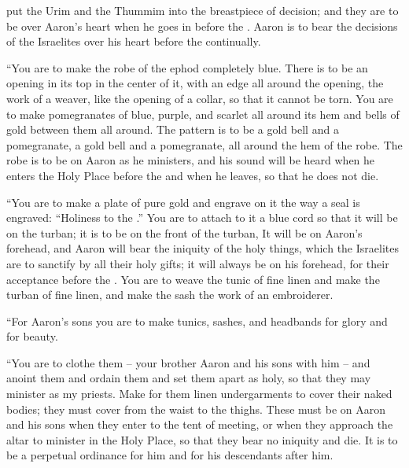 {put
the Urim
and the Thummim
into the breastpiece
of decision;
and they are to be
over
Aaron’s
heart
when he goes
in before
the {}. Aaron
is to bear
the
decisions
of the Israelites
over
his heart
before
the {}
continually.
\par }{\PP {}“You are to make
the robe
of the ephod
completely
blue.
There is to be
an opening
in its top
in the center
of it, with an edge
all around
the opening,
the work
of a weaver,
like the opening
of a collar,
so that it cannot
be torn.
You are to make
pomegranates
of blue,
purple,
and scarlet
all around
its hem
and bells
of gold
between
them all around.
The pattern is to be a gold
bell
and a pomegranate,
a gold
bell
and a pomegranate,
all around
the hem
of the robe.
The robe is to be
on
Aaron
as he ministers,
and his sound
will be heard
when
he enters
the Holy
Place before
the {}
and when
he leaves, so
that he does not
die.
\par }{\PP {}“You are to make
a plate
of pure
gold
and engrave
on it the way a seal
is engraved: “Holiness
to the
{}.”
You are to attach
to it a blue
cord
so that it will be
on
the turban;
it is to
be
on
the front of
the turban,
It will be
on
Aaron’s
forehead,
and Aaron
will bear
the iniquity
of the holy
things, which
the Israelites
are to sanctify
by all
their holy
gifts;
it will always be
on
his forehead,
for their acceptance
before
the {}.
You are to weave
the tunic
of fine linen
and make
the turban
of fine linen,
and make
the sash
the work
of an embroiderer.
\par }{\PP {}“For Aaron’s
sons
you are to make
tunics,
sashes,
and headbands
for glory
and for beauty.
\par }{\PP {}“You are to clothe
them – your brother Aaron and his sons with him – and anoint them and ordain them and set them apart as holy, so that they may minister as my priests.
Make
for them linen
undergarments
to cover
their naked
bodies;
they must cover
from the waist
to
the thighs.
These must be
on
Aaron
and his sons
when they enter
to
the tent
of meeting,
or
when they approach
the altar
to minister
in the Holy
Place, so that they bear
no
iniquity
and die.
It is to be a perpetual
ordinance
for him and for his descendants
after him.

}
